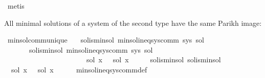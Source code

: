 \begin{isabellebody}
\ metis\isanewline
\ \ \isamarkupfalse%
\isanewline
{}\isamarkupfalse%
%
\endisatagproof
{\isafoldproof}%
%
\isadelimproof
%
\endisadelimproof
%
\begin{isamarkuptext}%
All minimal solutions of a system of the second type have the same Parikh image:%
\end{isamarkuptext}\isamarkuptrue%
\isamarkupfalse%
\ min{\isacharunderscore}{\kern0pt}sol{\isacharunderscore}{\kern0pt}comm{\isacharunderscore}{\kern0pt}unique{\isacharcolon}{\kern0pt}\isanewline
\ \ \ sol{}{\isacharunderscore}{\kern0pt}is{\isacharunderscore}{\kern0pt}min{\isacharunderscore}{\kern0pt}sol{\isacharcolon}{\kern0pt}\ {\isachardoublequoteopen}min{\isacharunderscore}{\kern0pt}sol{\isacharunderscore}{\kern0pt}ineq{\isacharunderscore}{\kern0pt}sys{\isacharunderscore}{\kern0pt}comm\ sys\ sol{}{\isachardoublequoteclose}\isanewline
\ \ \ \ \ \ \ sol{}{\isacharunderscore}{\kern0pt}is{\isacharunderscore}{\kern0pt}min{\isacharunderscore}{\kern0pt}sol{\isacharcolon}{\kern0pt}\ {\isachardoublequoteopen}min{\isacharunderscore}{\kern0pt}sol{\isacharunderscore}{\kern0pt}ineq{\isacharunderscore}{\kern0pt}sys{\isacharunderscore}{\kern0pt}comm\ sys\ sol{}{\isachardoublequoteclose}\isanewline
\ \ \ \ \ \ \ \ \ \ \ \ \ \ \ \ \ \ \ \ \ \ {\isachardoublequoteopen}{\isasymPsi}\ {\isacharparenleft}{\kern0pt}sol{}\ x{\isacharparenright}{\kern0pt}\ {\isacharequal}{\kern0pt}\ {\isasymPsi}\ {\isacharparenleft}{\kern0pt}sol{}\ x{\isacharparenright}{\kern0pt}{\isachardoublequoteclose}\isanewline
%
\isadelimproof
%
\endisadelimproof
%
\isatagproof
{}\isamarkupfalse%
\ {\isacharminus}{\kern0pt}\isanewline
\ \ \isamarkupfalse%
\ sol{}{\isacharunderscore}{\kern0pt}is{\isacharunderscore}{\kern0pt}min{\isacharunderscore}{\kern0pt}sol\ sol{}{\isacharunderscore}{\kern0pt}is{\isacharunderscore}{\kern0pt}min{\isacharunderscore}{\kern0pt}sol\ \isamarkupfalse%
\ {\isachardoublequoteopen}{\isasymPsi}\ {\isacharparenleft}{\kern0pt}sol{}\ x{\isacharparenright}{\kern0pt}\ {\isasymsubseteq}\ {\isasymPsi}\ {\isacharparenleft}{\kern0pt}sol{}\ x{\isacharparenright}{\kern0pt}{\isachardoublequoteclose}\isanewline
\ \ \ \ \isamarkupfalse%
\ min{\isacharunderscore}{\kern0pt}sol{\isacharunderscore}{\kern0pt}ineq{\isacharunderscore}{\kern0pt}sys{\isacharunderscore}{\kern0pt}comm{\isacharunderscore}{\kern0pt}def\ \isamarkupfalse%

\end{isabellebody}
